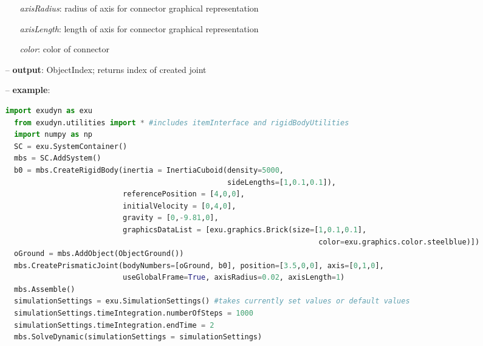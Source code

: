 \begin{itemize}[leftmargin=0.7cm]
\begin{itemize}[leftmargin=1.2cm]
\item[]{\it axisRadius}: radius of axis for connector graphical representation
\item[]{\it axisLength}: length of axis for connector graphical representation
\item[]{\it color}: color of connector
\end{itemize}
\item[--]
{\bf output}: ObjectIndex; returns index of created joint
\item[--]
{\bf example}: \vspace{-12pt}\ei\begin{lstlisting}[language=Python, xleftmargin=36pt]
  import exudyn as exu
  from exudyn.utilities import * #includes itemInterface and rigidBodyUtilities
  import numpy as np
  SC = exu.SystemContainer()
  mbs = SC.AddSystem()
  b0 = mbs.CreateRigidBody(inertia = InertiaCuboid(density=5000,
                                                   sideLengths=[1,0.1,0.1]),
                           referencePosition = [4,0,0],
                           initialVelocity = [0,4,0],
                           gravity = [0,-9.81,0],
                           graphicsDataList = [exu.graphics.Brick(size=[1,0.1,0.1],
                                                                        color=exu.graphics.color.steelblue)])
  oGround = mbs.AddObject(ObjectGround())
  mbs.CreatePrismaticJoint(bodyNumbers=[oGround, b0], position=[3.5,0,0], axis=[0,1,0],
                           useGlobalFrame=True, axisRadius=0.02, axisLength=1)
  mbs.Assemble()
  simulationSettings = exu.SimulationSettings() #takes currently set values or default values
  simulationSettings.timeIntegration.numberOfSteps = 1000
  simulationSettings.timeIntegration.endTime = 2
  mbs.SolveDynamic(simulationSettings = simulationSettings)
\end{lstlisting}\vspace{-24pt}\bi\item[]\vspace{-24pt}\vspace{12pt}\end{itemize}
%

